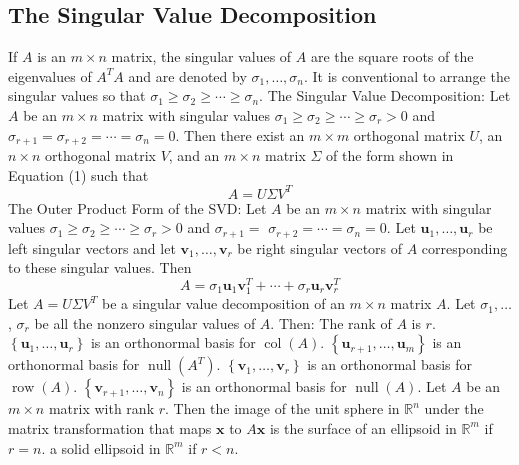 \documentclass{article}
\begin{document}
        \subsection{The Singular Value Decomposition} 
        \begin{outline}
            \1 If $A$ is an $m \times n$ matrix, the singular values of $A$ are the square roots of the eigenvalues of $A^{T} A$ and are denoted by $\sigma_{1}, \ldots, \sigma_{n}$. It is conventional to arrange the singular values so that $\sigma_{1} \geq \sigma_{2} \geq \cdots \geq \sigma_{n}$.
            \1 The Singular Value Decomposition: Let $A$ be an $m \times n$ matrix with singular values $\sigma_{1} \geq \sigma_{2} \geq \cdots \geq \sigma_{r}>0$ and $\sigma_{r+1}=\sigma_{r+2}=\cdots=\sigma_{n}=0$. Then there exist an $m \times m$ orthogonal matrix $U$, an $n \times n$ orthogonal matrix $V$, and an $m \times n$ matrix $\Sigma$ of the form shown in Equation (1) such that
            \[A=U \Sigma V^{T}\]
            \1 The Outer Product Form of the SVD: Let $A$ be an $m \times n$ matrix with singular values $\sigma_{1} \geq \sigma_{2} \geq \cdots \geq \sigma_{r}>0$ and $\sigma_{r+1}=$ $\sigma_{r+2}=\cdots=\sigma_{n}=0$. Let $\mathbf{u}_{1}, \ldots, \mathbf{u}_{r}$ be left singular vectors and let $\mathbf{v}_{1}, \ldots, \mathbf{v}_{r}$ be right singular vectors of $A$ corresponding to these singular values. Then
            \[A=\sigma_{1} \mathbf{u}_{1} \mathbf{v}_{1}^{T}+\cdots+\sigma_{r} \mathbf{u}_{r} \mathbf{v}_{r}^{T}\]
            \1 Let $A=U \Sigma V^{T}$ be a singular value decomposition of an $m \times n$ matrix $A$. Let $\sigma_{1}, \ldots$, $\sigma_{r}$ be all the nonzero singular values of $A$. Then:
                \2 The rank of $A$ is $r$.
                \2 $\left\{\mathbf{u}_{1}, \ldots, \mathbf{u}_{r}\right\}$ is an orthonormal basis for $\operatorname{col}(A)$.
                \2 $\left\{\mathbf{u}_{r+1}, \ldots, \mathbf{u}_{m}\right\}$ is an orthonormal basis for $\operatorname{null}\left(A^{T}\right)$.
                \2 $\left\{\mathbf{v}_{1}, \ldots, \mathbf{v}_{r}\right\}$ is an orthonormal basis for $\operatorname{row}(A)$.
                \2 $\left\{\mathbf{v}_{r+1}, \ldots, \mathbf{v}_{n}\right\}$ is an orthonormal basis for $\operatorname{null}(A)$.
            \1 Let $A$ be an $m \times n$ matrix with rank $r$. Then the image of the unit sphere in $\mathbb{R}^{n}$ under the matrix transformation that maps $\mathbf{x}$ to $A \mathbf{x}$ is
                \2 the surface of an ellipsoid in $\mathbb{R}^{m}$ if $r=n$.
                \2 a solid ellipsoid in $\mathbb{R}^{m}$ if $r<n$.

\end{outline}
\end{document}
